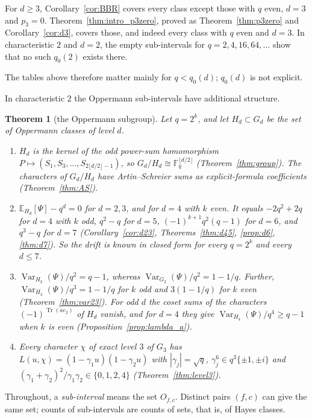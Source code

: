 \documentclass[11pt,a4paper]{amsart}
\newtheorem{theorem}{Theorem}[section]
\theoremstyle{definition}
\theoremstyle{remark}
\newcommand{\F}{\mathbb{F}}
\newcommand{\Tr}{\operatorname{Tr}}
\newcommand{\E}{\mathbb{E}}
\newcommand{\Var}{\operatorname{Var}}
\begin{document}
For $d\ge3$, Corollary~\ref{cor:BBR} covers every class except those with $q$ even, $d=3$ and $p_3=0$.
Theorem~\ref{thm:intro_p3zero}, proved as Theorem~\ref{thm:p3zero} and Corollary~\ref{cor:d3}, covers those, and indeed every class with $q$
even and $d=3$. In characteristic $2$ and $d=2$, the
empty sub-intervals for $q=2,4,16,64,\dots$ show that no such $q_0(2)$ exists there.

The tables above therefore matter mainly for $q<q_0(d)$; $q_0(d)$ is not explicit.

In characteristic $2$ the Oppermann sub-intervals have additional structure.

\begin{theorem}[the Oppermann subgroup]\label{thm:summary}
Let $q=2^k$, and let $H_d\subset G_d$ be the set of Oppermann classes of level $d$.
\begin{enumerate}
\item $H_d$ is the kernel of the odd power-sum homomorphism $P\mapsto(S_1,S_3,\dots,S_{2\lfloor d/2\rfloor-1})$, so
$G_d/H_d\cong\F_q^{\lfloor d/2\rfloor}$ (Theorem~\ref{thm:group}). The characters of $G_d/H_d$ have Artin--Schreier
sums as explicit-formula coefficients (Theorem~\ref{thm:AS}).
\item $\E_{H_d}[\Psi]-q^d=0$ for $d=2,3$, and for $d=4$ with $k$ even. It equals $-2q^2+2q$ for $d=4$ with $k$ odd,
$q^2-q$ for $d=5$, $(-1)^{k+1}q^2(q-1)$ for $d=6$, and $q^3-q$ for $d=7$ (Corollary~\ref{cor:d23},
Theorems~\ref{thm:d45}, \ref{prop:d6}, \ref{thm:d7}). So the drift is known in closed form for every $q=2^k$ and
every $d\le7$.
\item $\Var_{H_2}(\Psi)/q^2=q-1$, whereas $\Var_{G_2}(\Psi)/q^2=1-1/q$. Further, $\Var_{H_3}(\Psi)/q^3=1-1/q$ for $k$
odd and $3(1-1/q)$ for $k$ even (Theorem~\ref{thm:var23}). For odd $d$ the coset sums of the characters
$(-1)^{\Tr(ae_2)}$ of $H_d$ vanish, and for $d=4$ they give $\Var_{H_4}(\Psi)/q^4\ge q-1$ when $k$ is even
(Proposition~\ref{prop:lambda_a}).
\item Every character $\chi$ of exact level $3$ of $G_3$ has $L(u,\chi)=(1-\gamma_1u)(1-\gamma_2u)$ with
$|\gamma_j|=\sqrt q$, $\gamma_j^6\in q^3\{\pm1,\pm i\}$ and $(\gamma_1+\gamma_2)^2/\gamma_1\gamma_2\in\{0,1,2,4\}$
(Theorem~\ref{thm:level3}).
\end{enumerate}
\end{theorem}

Throughout, a \emph{sub-interval} means the set $O_{f,c}$. Distinct pairs $(f,c)$ can give the same set; counts of
sub-intervals are counts of sets, that is, of Hayes classes.
\end{document}
